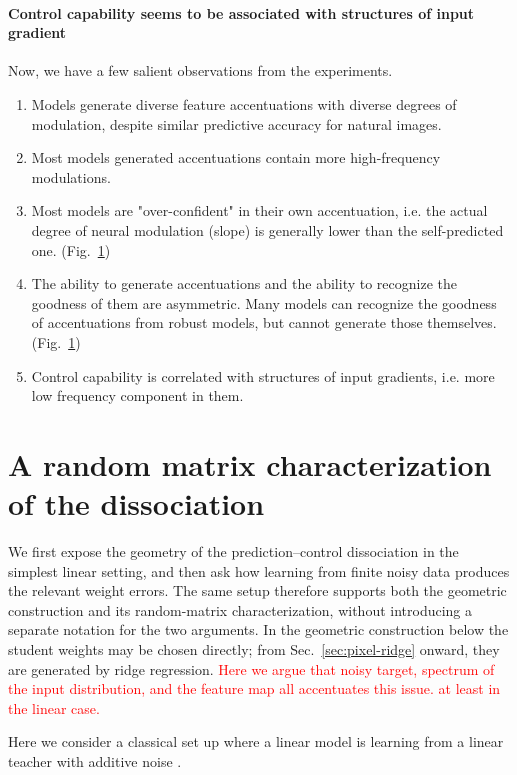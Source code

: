 \documentclass{article}
\newcommand{\red}[1]{\textcolor{red}{#1}}
\theoremstyle{plain}
\theoremstyle{definition}
\begin{document}
\paragraph{Control capability seems to be associated with structures of input gradient}

Now, we have a few salient observations from the experiments.
\begin{enumerate}
    \item Models generate diverse feature accentuations with diverse degrees of modulation, despite similar predictive accuracy for natural images.
    \item Most models generated accentuations contain more high-frequency modulations.
    \item Most models are "over-confident" in their own accentuation, i.e. the actual degree of neural modulation (slope) is generally lower than the self-predicted one. (Fig.~\ref{})
    \item The ability to generate accentuations and the ability to recognize the goodness of them are asymmetric. Many models can recognize the goodness of accentuations from robust models, but cannot generate those themselves. (Fig.~\ref{})
    \item Control capability is correlated with structures of input gradients, i.e. more low frequency component in them. %
\end{enumerate}


\section{A random matrix characterization of the dissociation}

We first expose the geometry of the prediction--control dissociation in the simplest linear setting, and then ask how learning from finite noisy data produces the relevant weight errors.
The same setup therefore supports both the geometric construction and its random-matrix characterization, without introducing a separate notation for the two arguments.
In the geometric construction below the student weights may be chosen directly; from Sec.~\ref{sec:pixel-ridge} onward, they are generated by ridge regression.
\red{Here we argue that noisy target, spectrum of the input distribution, and the feature map all accentuates this issue. at least in the linear case.}

Here we consider a classical set up where a linear model is learning from a linear teacher with additive noise \cite{}. %
\end{document}
